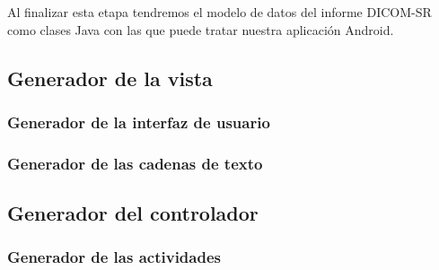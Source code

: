Al finalizar esta etapa tendremos el modelo de datos del informe DICOM-SR como clases Java con las que puede tratar nuestra aplicación Android.\par

\subsection{Generador de la vista}
\subsubsection{Generador de la interfaz de usuario}
\subsubsection{Generador de las cadenas de texto}\label{vista:strings}

\subsection{Generador del controlador}
\subsubsection{Generador de las actividades}

